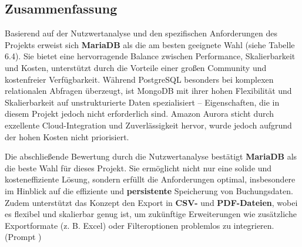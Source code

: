 


\subsection{Zusammenfassung}

Basierend auf der Nutzwertanalyse und den spezifischen Anforderungen des Projekts erweist sich \textbf{MariaDB} als die am besten geeignete Wahl (siehe Tabelle 6.4). Sie bietet eine hervorragende Balance zwischen Performance, Skalierbarkeit und Kosten, unterstützt durch die Vorteile einer großen Community und kostenfreier Verfügbarkeit. Während PostgreSQL besonders bei komplexen relationalen Abfragen überzeugt, ist MongoDB mit ihrer hohen Flexibilität und Skalierbarkeit auf unstrukturierte Daten spezialisiert – Eigenschaften, die in diesem Projekt jedoch nicht erforderlich sind. Amazon Aurora sticht durch exzellente Cloud-Integration und Zuverlässigkeit hervor, wurde jedoch aufgrund der hohen Kosten nicht priorisiert.

\vspace{2mm}

\noindent Die abschließende Bewertung durch die Nutzwertanalyse bestätigt \textbf{MariaDB} als die beste Wahl für dieses Projekt. Sie ermöglicht nicht nur eine solide und kosteneffiziente Lösung, sondern erfüllt die Anforderungen optimal, insbesondere im Hinblick auf die effiziente und \textbf{persistente} Speicherung von Buchungsdaten. Zudem unterstützt das Konzept den Export in \textbf{CSV-} und \textbf{PDF-Dateien}, wobei es flexibel und skalierbar genug ist, um zukünftige Erweiterungen wie zusätzliche Exportformate (z. B. Excel) oder Filteroptionen problemlos zu integrieren. (Prompt \cite{ChatGPT:rewrite4})
